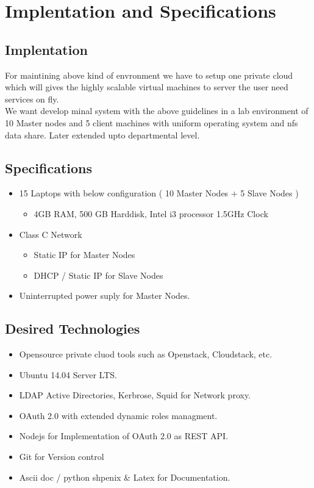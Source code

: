 \documentclass[12pt]{report}
\begin{document}
\chapter{Implentation and Specifications}

\section{Implentation}

	For maintining above kind of envronment we have to setup one private cloud which will gives the highly scalable virtual machines to server the user need services on fly.\\
	
	We want develop minal system with the above guidelines in a lab environment of 10 Master nodes and 5 client machines with uniform operating system and nfs data share. Later extended upto departmental level.
	
	
\section{Specifications}

	\begin{itemize}
		\item 15 Laptops with below configuration ( 10 Master Nodes + 5 Slave Nodes )
			\begin{itemize}
				\item 4GB RAM, 500 GB Harddisk, Intel i3 processor 1.5GHz Clock
			\end{itemize}
		
		\item Class C Network 
			\begin{itemize}
			 	\item Static IP for Master Nodes
			 	\item DHCP / Static IP for Slave Nodes
			\end{itemize}
			
		\item Uninterrupted power suply for Master Nodes.
		
	\end{itemize}
	
\section{Desired Technologies}

	\begin{itemize}
		\item Opensource private cluod tools such as Openstack, Cloudstack, etc.
		\item Ubuntu 14.04 Server LTS.
		\item LDAP Active Directories, Kerbrose, Squid for Network proxy.
		\item OAuth 2.0 with extended dynamic roles managment.
		\item Nodejs for Implementation of OAuth 2.0 as REST API.
		\item Git for Version control 
		\item Ascii doc / python shpenix \& Latex for Documentation.
	\end{itemize}
	
\end{document}
